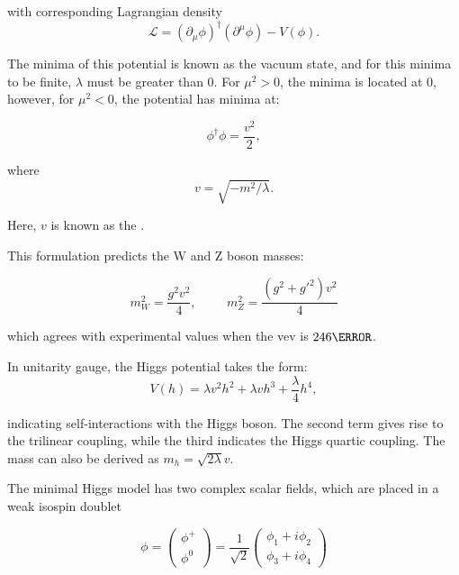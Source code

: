 with corresponding Lagrangian density
\begin{equation}
    \mathcal{L} = (\partial_{\mu}\phi)^\dagger (\partial^{\mu}\phi) - V(\phi).
\end{equation}

The minima of this potential is known as the vacuum state, and for this minima to be finite, $\lambda$ must be greater than 0. For $\mu^2 >0$, the minima is located at 0, however, for $\mu^2<0$, the potential has minima at:


\begin{equation}
    \phi^\dagger \phi = \frac{v^2}{2},
\end{equation}

where 
\begin{equation}
    v = \sqrt{-m^2 / \lambda}.
\end{equation}



Here, $v$ is known as the . 

This formulation predicts the W and Z boson masses:

\begin{equation}
    m^2_W = \frac{g^2 v^2}{4}, \hspace{1cm} m^2_Z = \frac{(g^2 +g'^2)v^2}{4}
\end{equation}

which agrees with experimental values when the \gls{vev} is $\unit{246}{\GeV}$.


In unitarity gauge, the Higgs potential takes the form:
\begin{equation}
    V(h) = \lambda v^2 h^2 + \lambda v h^3 + \frac{\lambda}{4}h^4,
\end{equation}

indicating self-interactions with the Higgs boson. The second term gives rise to the trilinear coupling, while the third indicates the Higgs quartic coupling. The mass can also be derived as $m_h = \sqrt{2\lambda}v$. 


The minimal Higgs model has two complex scalar fields, which are placed in a weak isospin doublet

\begin{equation}
\phi = \begin{pmatrix} \phi^+ \\ \phi^0 \end{pmatrix}
    = \frac{1}{\sqrt{2}}\begin{pmatrix}
        \phi_1 + i\phi_2 \\ \phi_3 + i\phi_4
    \end{pmatrix}
\end{equation}

